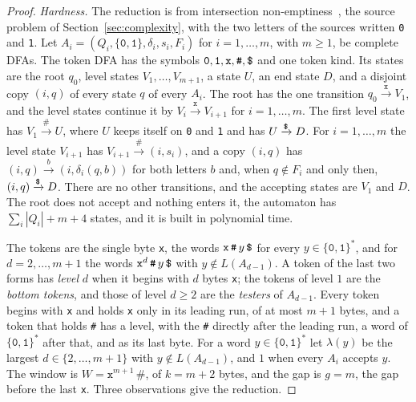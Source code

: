 \documentclass[11pt,a4paper]{article}
\theoremstyle{definition}
\theoremstyle{plain}
\newcommand{\code}[1]{\texttt{#1}}
\begin{document}
\begin{proof}
\emph{Hardness.} The reduction is from intersection non-emptiness~\cite[Lemma~3.2.3, p.~261]{kozen1977lower}, the source
problem of Section~\ref{sec:complexity}, with the two letters of the sources written \code{0} and \code{1}. Let
$A_i = (Q_i, \{\code{0}, \code{1}\}, \delta_i, s_i, F_i)$ for $i = 1, \ldots, m$, with $m \geq 1$, be complete DFAs. The
token DFA has the symbols $\code{0}, \code{1}, \code{x}, \code{\#}, \code{\symbol{36}}$ and one token kind. Its states
are the root $q_0$, level states $V_1, \ldots, V_{m+1}$, a state $U$, an end state $D$, and a disjoint copy $(i, q)$ of
every state $q$ of every $A_i$. The root has the one transition $q_0 \xrightarrow{\code{x}} V_1$, and the level states
continue it by $V_i \xrightarrow{\code{x}} V_{i+1}$ for $i = 1, \ldots, m$. The first level state has
$V_1 \xrightarrow{\code{\#}} U$, where $U$ keeps itself on \code{0} and \code{1} and has
$U \xrightarrow{\code{\symbol{36}}} D$. For $i = 1, \ldots, m$ the level state $V_{i+1}$ has
$V_{i+1} \xrightarrow{\code{\#}} (i, s_i)$, and a copy $(i, q)$ has $(i, q) \xrightarrow{b} (i, \delta_i(q, b))$ for
both letters $b$ and, when $q \notin F_i$ and only then, $(i, q) \xrightarrow{\code{\symbol{36}}} D$. There are no other
transitions, and the accepting states are $V_1$ and $D$. The root does not accept and nothing enters it, the automaton
has $\sum_i |Q_i| + m + 4$ states, and it is built in polynomial time.

The tokens are the single byte \code{x}, the words $\code{x}\, \code{\#}\, y\, \code{\symbol{36}}$ for every
$y \in \{\code{0}, \code{1}\}^*$, and for $d = 2, \ldots, m + 1$ the words
$\code{x}^{d}\, \code{\#}\, y\, \code{\symbol{36}}$ with $y \notin L(A_{d-1})$. A token of the last two forms has
\emph{level} $d$ when it begins with $d$ bytes \code{x}; the tokens of level $1$ are the \emph{bottom tokens}, and those
of level $d \geq 2$ are the \emph{testers} of $A_{d-1}$. Every token begins with \code{x} and holds \code{x} only in its
leading run, of at most $m + 1$ bytes, and a token that holds \code{\#} has a level, with the \code{\#} directly after
the leading run, a word of $\{\code{0}, \code{1}\}^*$ after that, and \code{} as its last byte. For a word
$y \in \{\code{0}, \code{1}\}^*$ let $\lambda(y)$ be the largest $d \in \{2, \ldots, m + 1\}$ with
$y \notin L(A_{d-1})$, and $1$ when every $A_i$ accepts $y$. The window is $W = \code{x}^{m+1}\, \code{\#}$, of
$k = m + 2$ bytes, and the gap is $g = m$, the gap before the last \code{x}. Three observations give the reduction.


\end{proof}
\end{document}
